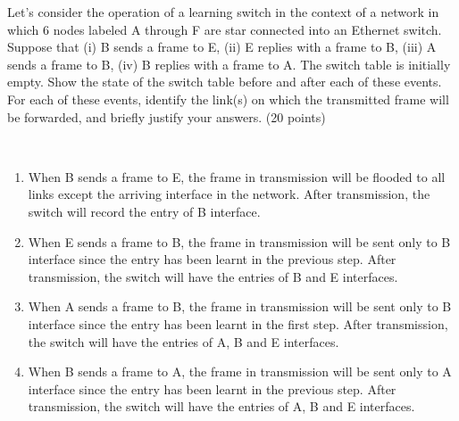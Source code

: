 \begin{exercise}[]{Let’s consider the operation of a learning switch in the context of a network
    in which 6 nodes labeled A through F are star connected into an Ethernet switch. Suppose
    that (i) B sends a frame to E, (ii) E replies with a frame to B, (iii) A sends a frame to B, (iv)
    B replies with a frame to A. The switch table is initially empty. Show the state of the switch
    table before and after each of these events. For each of these events, identify the link(s) on
    which the transmitted frame will be forwarded, and briefly justify your answers. (20 points)}
  \begin{solution}
  \par{~}
  \begin{enumerate}
    \item When B sends a frame to E, the frame in transmission will be flooded to all links except the arriving interface in the network. After transmission, the switch will record the entry of B interface.
    \item When E sends a frame to B, the frame in transmission will be sent only to B interface since the entry has been learnt in the previous step. After transmission, the switch will have the entries of B and E interfaces.
    \item When A sends a frame to B, the frame in transmission will be sent only to B interface since the entry has been learnt in the first step. After transmission, the switch will have the entries of A, B and E interfaces.
    \item When B sends a frame to A, the frame in transmission will be sent only to A interface since the entry has been learnt in the previous step. After transmission, the switch will have the entries of A, B and E interfaces.
  \end{enumerate}
  \end{solution}
  \label{ex6}
\end{exercise}